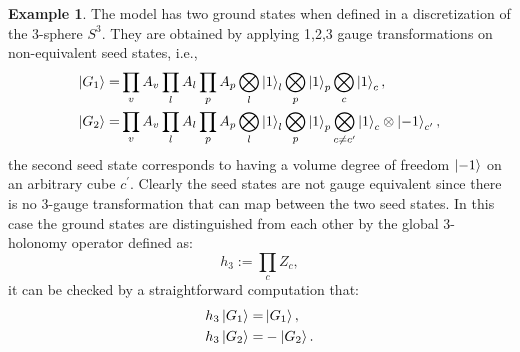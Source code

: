 \documentclass[titlepage,11pt]{article}
\theoremstyle{plain}%
\theoremstyle{definition}
\newtheorem{exmp}[thm]{Example}
\theoremstyle{remark}
\begin{document}
\begin{exmp}

The model has two ground states when defined in a discretization of the 3-sphere $S^3$. They are obtained by applying 1,2,3 gauge transformations on non-equivalent seed states, i.e.,
\begin{align*}
\ket{G_1}=&\prod_{v}A_v\prod_{l}A_l\prod_{p}A_p\bigotimes_{l}\ket{1}_l\bigotimes_{p}\ket{1}_p\bigotimes_{c}\ket{1}_c, \\
\ket{G_2}=&\prod_{v}A_v\prod_{l}A_l\prod_{p}A_p\bigotimes_{l}\ket{1}_l\bigotimes_{p}\ket{1}_p\bigotimes_{c\neq c^\prime}\ket{1}_c\otimes\ket{-1}_{c^\prime},
\end{align*}
the second seed state corresponds to having a volume degree of freedom $\ket{-1}$ on an arbitrary cube $c^{\prime}$. Clearly the seed states are not gauge equivalent since there is no 3-gauge transformation that can map between the two seed states. In this case the ground states are distinguished from each other by the global 3-holonomy operator defined as:
\begin{equation}\label{eq:glob3h}
h_3:=\prod_{c} Z_c,
\end{equation}
it can be checked by a straightforward computation that:
\begin{align*}
h_3\ket{G_1}=&\ket{G_1}, \\
h_3\ket{G_2}=&-\ket{G_2}.
\end{align*}


\end{exmp}
\end{document}
